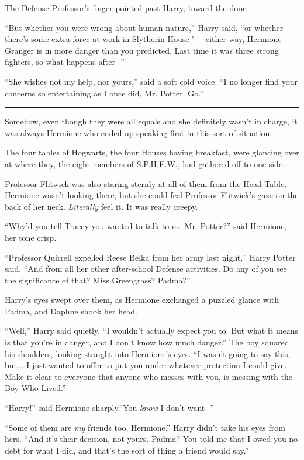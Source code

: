 The Defense Professor's finger pointed past Harry, toward the door.

``But whether you were wrong about human nature,'' Harry said, ``or
whether there's some extra force at work in Slytherin House "--- either
way, Hermione Granger is in more danger than you predicted. Last time it
was three strong fighters, so what happens after -''

``She wishes not my help, nor yours,'' said a soft cold voice. ``I no
longer find your concerns so entertaining as I once did, Mr. Potter.
Go.''

\begin{center}\rule{3in}{0.4pt}\end{center}

Somehow, even though they were all equals and she definitely wasn't in
charge, it was always Hermione who ended up speaking first in this sort
of situation.

The four tables of Hogwarts, the four Houses having breakfast, were
glancing over at where they, the eight members of S.P.H.E.W., had
gathered off to one side.

Professor Flitwick was also staring sternly at all of them from the Head
Table. Hermione wasn't looking there, but she could feel Professor
Flitwick's gaze on the back of her neck. \emph{Literally} feel it. It
was really creepy.

``Why'd you tell Tracey you wanted to talk to us, Mr. Potter?'' said
Hermione, her tone crisp.

``Professor Quirrell expelled Reese Belka from her army last night,''
Harry Potter said. ``And from all her other after-school Defense
activities. Do any of you see the significance of that? Miss Greengrass?
Padma?''

Harry's eyes swept over them, as Hermione exchanged a puzzled glance
with Padma, and Daphne shook her head.

``Well,'' Harry said quietly, ``I wouldn't actually expect you to. But
what it means is that you're in danger, and I don't know how much
danger.'' The boy squared his shoulders, looking straight into
Hermione's eyes. ``I wasn't going to say this, but... I just wanted
to offer to put you under whatever protection I could give. Make it
clear to everyone that anyone who messes with you, is messing with the
Boy-Who-Lived.''

``Harry!'' said Hermione sharply.''You \emph{know} I don't want -''

``Some of them are \emph{my} friends too, Hermione.'' Harry didn't take
his eyes from hers. ``And it's their decision, not yours. Padma? You
told me that I owed you no debt for what I did, and that's the sort of
thing a friend would say.''

